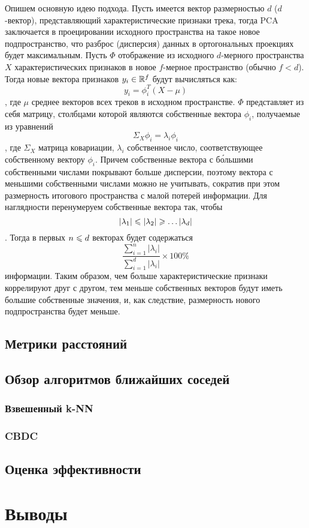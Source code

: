 Опишем основную идею подхода. Пусть имеется вектор размерностью $d$ ($d$-вектор), представляющий характеристические признаки трека, тогда PCA заключается в проецировании исходного пространства
на такое новое подпространство, что разброс (дисперсия) данных в ортогональных проекциях будет максимальным. Пусть $\Phi$ \ld отображение из исходного $d$-мерного пространства $X$ характеристических
признаков в новое $f$-мерное пространство (обычно $f < d$). Тогда новые вектора признаков $y_i \in \mathbb{R}^f$ будут вычисляться как:
$$ y_i = \phi_i^T(X - \mu) $$,
где $\mu$ \ld среднее векторов всех треков в исходном пространстве. $\Phi$ представляет из себя матрицу, столбцами которой являются собственные вектора $\phi_i$, получаемые из уравнений
$$\Sigma_X \phi_i = \lambda_i\phi_i $$,
где $\Sigma_X$ \ld матрица ковариации, $\lambda_i$ \ld собственное число, соответствующее собственному вектору $\phi_i$. Причем собственные вектора с б\'{о}льшими собственными числами покрывают
больше дисперсии, поэтому вектора с меньшими собственными числами можно не учитывать, сократив при этом размерность итогового пространства с малой потерей информации. Для наглядности 
перенумеруем собственные вектора так, чтобы
$$|\lambda_1| \leqslant |\lambda_2| \geqslant \ldots |\lambda_d|$$.
Тогда в первых $n \leqslant d$ векторах будет содержаться 
$$\frac{\sum_{i=1}^{n} |\lambda_i|}{\sum_{i=1}^{d} |\lambda_i|} \times 100\%$$ 
информации. Таким образом, чем больше характеристические признаки коррелируют друг с другом, тем меньше собственных векторов будут иметь большие собственные значения, и, как следствие, размерность нового подпространства
будет меньше.

\subsection{Метрики расстояний}
\subsection{Обзор алгоритмов ближайших соседей}
\subsubsection{Взвешенный k-NN}
\subsubsection{CBDC}
\subsection{Оценка эффективности}
\section{Выводы}





